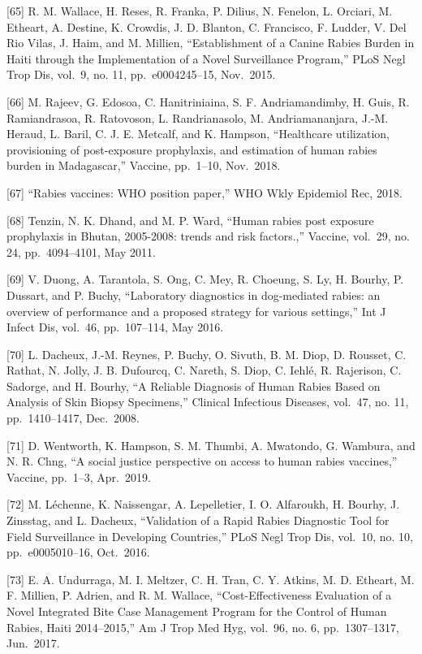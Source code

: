 \documentclass[
  oneside]{book}
\begin{document}
{[}65{]} R. M. Wallace, H. Reses, R. Franka, P. Dilius, N. Fenelon, L. Orciari, M. Etheart, A. Destine, K. Crowdis, J. D. Blanton, C. Francisco, F. Ludder, V. Del Rio Vilas, J. Haim, and M. Millien, ``Establishment of a Canine Rabies Burden in Haiti through the Implementation of a Novel Surveillance Program,'' PLoS Negl Trop Dis, vol.~9, no. 11, pp.~e0004245--15, Nov.~2015.

{[}66{]} M. Rajeev, G. Edosoa, C. Hanitriniaina, S. F. Andriamandimby, H. Guis, R. Ramiandrasoa, R. Ratovoson, L. Randrianasolo, M. Andriamananjara, J.-M. Heraud, L. Baril, C. J. E. Metcalf, and K. Hampson, ``Healthcare utilization, provisioning of post-exposure prophylaxis, and estimation of human rabies burden in Madagascar,'' Vaccine, pp.~1--10, Nov.~2018.

{[}67{]} ``Rabies vaccines: WHO position paper,'' WHO Wkly Epidemiol Rec, 2018.

{[}68{]} Tenzin, N. K. Dhand, and M. P. Ward, ``Human rabies post exposure prophylaxis in Bhutan, 2005-2008: trends and risk factors.,'' Vaccine, vol.~29, no. 24, pp.~4094--4101, May 2011.

{[}69{]} V. Duong, A. Tarantola, S. Ong, C. Mey, R. Choeung, S. Ly, H. Bourhy, P. Dussart, and P. Buchy, ``Laboratory diagnostics in dog-mediated rabies: an overview of performance and a proposed strategy for various settings,'' Int J Infect Dis, vol.~46, pp.~107--114, May 2016.

{[}70{]} L. Dacheux, J.-M. Reynes, P. Buchy, O. Sivuth, B. M. Diop, D. Rousset, C. Rathat, N. Jolly, J. B. Dufourcq, C. Nareth, S. Diop, C. Iehlé, R. Rajerison, C. Sadorge, and H. Bourhy, ``A Reliable Diagnosis of Human Rabies Based on Analysis of Skin Biopsy Specimens,'' Clinical Infectious Diseases, vol.~47, no. 11, pp.~1410--1417, Dec.~2008.

{[}71{]} D. Wentworth, K. Hampson, S. M. Thumbi, A. Mwatondo, G. Wambura, and N. R. Chng, ``A social justice perspective on access to human rabies vaccines,'' Vaccine, pp.~1--3, Apr.~2019.

{[}72{]} M. Léchenne, K. Naissengar, A. Lepelletier, I. O. Alfaroukh, H. Bourhy, J. Zinsstag, and L. Dacheux, ``Validation of a Rapid Rabies Diagnostic Tool for Field Surveillance in Developing Countries,'' PLoS Negl Trop Dis, vol.~10, no. 10, pp.~e0005010--16, Oct.~2016.

{[}73{]} E. A. Undurraga, M. I. Meltzer, C. H. Tran, C. Y. Atkins, M. D. Etheart, M. F. Millien, P. Adrien, and R. M. Wallace, ``Cost-Effectiveness Evaluation of a Novel Integrated Bite Case Management Program for the Control of Human Rabies, Haiti 2014--2015,'' Am J Trop Med Hyg, vol.~96, no. 6, pp.~1307--1317, Jun.~2017.
\end{document}
